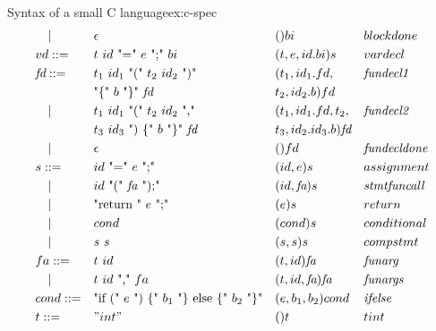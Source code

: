 \documentclass{article}
\begin{document}
\begin{example}{Syntax of a small C language}{ex:c-spec}
\[\begin{aligned}
&\quad |    &   & \epsilon &                                        &()bi          &                &blockdone              \\
&vd ::=      &  & \text{$t$ $id$ "=" $e$ ";" $bi$}&                 &(t,e,id.bi)s &                 &vardecl                \\               
&\textit{fd} ::=&& \text{$t_1$ $id_1$ "(" $t_2$ $id_2$ ")"}&        &(t_1,id_1.fd,&                 &\textit{fundecl1}      \\                
&           &   & \text{"\{" $b$ "\}" \textit{fd}}&                 &t_2,id_2.b)fd\\
&\quad |    &   & \text{$t_1$ $id_1$ "(" $t_2$ $id_2$ ","}&         &(t_1,id_1.fd,t_2, &            &\textit{fundecl2}\\
&           &   & \text{$t_3$ $id_3$ ") \{" $b$ "\}" $\textit{fd}$}& &t_3,id_2.id_3.b)\textit{fd}\\
&\quad |    &   & \text{$\epsilon$}&                                &()fd &                         &\textit{fundecldone}             \\
&s ::=      &   & \text{$id$ "=" $e$ ";"}&                          &(id,e)s &                      &assignment             \\
&\quad |    &   & \text{$id$ "(" \textit{fa} ");"}&                 &(id,\textit{fa})s&             &\textit{stmtfuncall}             \\
&\quad |    &   & \text{"return " $e$ ";"}&                         &(e)s        &                  &return             \\
&\quad |    &   & \text{$cond$}&                                    &(cond)s        &               &conditional             \\
&\quad |    &   & \text{$s$ $s$}&                                   &(s,s)s        &                &compstmt             \\
&fa ::=     &   & \text{$t$ $id$}&                                  &(t,id)\textit{fa} &            &\textit{funarg}                \\
&\quad |    &   & \text{$t$ $id$ "," $fa$}&                         &(t,id,\textit{fa})\textit{fa} &&\textit{funargs}                \\
&cond ::=   &   & \text{"if (" $e$ ") \{" $b_1$ "\} else \{" $b_2$ "\}"}&&(e,b_1,b_2)cond &         &\textit{ifelse}             \\
&t ::=      &   & "int"&                                            &()t        &                   &tint               \\

\end{aligned}\]
\end{example}
\end{document}
